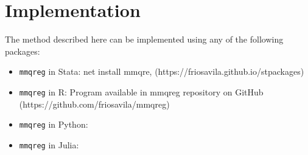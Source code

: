 \documentclass[
  authoryear,
  review,
  1p]{elsarticle}
\providecommand{\tightlist}{%
  \setlength{\itemsep}{0pt}\setlength{\parskip}{0pt}}\usepackage{longtable,booktabs,array}
\begin{document}
\hypertarget{implementation}{%
\section{Implementation}\label{implementation}}

The method described here can be implemented using any of the following
packages:

\begin{itemize}
\tightlist
\item
  \texttt{mmqreg} in Stata: net install mmqre,
  (https://friosavila.github.io/stpackages)
\item
  \texttt{mmqreg} in R: Program available in mmqreg repository on GitHub
  (https://github.com/friosavila/mmqreg)
\item
  \texttt{mmqreg} in Python:
\item
  \texttt{mmqreg} in Julia:
\end{itemize}
\end{document}
